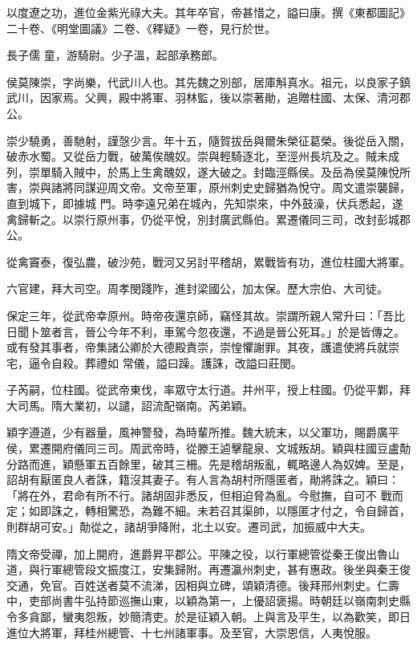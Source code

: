 \begin{pinyinscope}
 以度遼之功，進位金紫光祿大夫。其年卒官，帝甚惜之，謚曰康。撰《東都圖記》二十卷、《明堂圖議》二卷、《釋疑》一卷，見行於世。



 長子儒
 童，游騎尉。少子溫，起部承務郎。



 侯莫陳崇，字尚樂，代武川人也。其先魏之別部，居庫斛真水。祖元，以良家子鎮武川，因家焉。父興，殿中將軍、羽林監，後以崇著勛，追贈柱國、太保、清河郡公。



 崇少驍勇，善馳射，謹愨少言。年十五，隨賀拔岳與爾朱榮征葛榮。後從岳入關，破赤水蜀。又從岳力戰，破萬俟醜奴。崇與輕騎逐北，至涇州長坑及之。賊未成列，崇單騎入賊中，於馬上生禽醜奴，遂大破之。封臨涇縣侯。及岳為侯莫陳悅所害，崇與諸將同謀迎周文帝。文帝至軍，原州刺史史歸猶為悅守。周文遣崇襲歸，直到城下，即據城
 門。時李遠兄弟在城內，先知崇來，中外鼓澡，伏兵悉起，遂禽歸斬之。以崇行原州事，仍從平悅，別封廣武縣伯。累遷儀同三司，改封彭城郡公。



 從禽竇泰，復弘農，破沙苑，戰河又另討平稽胡，累戰皆有功，進位柱國大將軍。



 六官建，拜大司空。周孝閔踐阼，進封梁國公，加太保。歷大宗伯、大司徒。



 保定三年，從武帝幸原州。時帝夜還京師，竊怪其故。崇謂所親人常升曰：「吾比日聞卜筮者言，晉公今年不利，車駕今忽夜還，不過是晉公死耳。」於是皆傳之。或有發其事者，帝集諸公卿於大德殿責崇，崇惶懼謝罪。其夜，護遣使將兵就崇宅，逼令自殺。葬禮如
 常儀，謚曰躁。護誅，改謚曰莊閔。



 子芮嗣，位柱國。從武帝東伐，率眾守太行道。并州平，授上柱國。仍從平鄴，拜大司馬。隋大業初，以譴，詔流配嶺南。芮弟穎。



 穎字遵道，少有器量，風神警發，為時輩所推。魏大統末，以父軍功，賜爵廣平侯，累遷開府儀同三司。周武帝時，從滕王逌擊龍泉、文城叛胡。穎與柱國豆盧勣分路而進，穎懸軍五百餘里，破其三柵。先是稽胡叛亂，輒略邊人為奴婢。至是，詔胡有厭匿良人者誅，籍沒其妻子。有人言為胡村所隱匿者，勛將誅之。穎曰：「將在外，君命有所不行。諸胡固非悉反，但相迫脅為亂。今慰撫，自可不
 戰而定；如即誅之，轉相驚恐，為難不細。未若召其渠帥，以隱匿才付之，令自歸首，則群胡可安。」勣從之，諸胡爭降附，北土以安。遷司武，加振威中大夫。



 隋文帝受禪，加上開府，進爵昇平郡公。平陳之役，以行軍總管從秦王俊出魯山道，與行軍總管段文振度江，安集歸附。再遷瀛州刺史，甚有惠政。後坐與秦王俊交通，免官。百姓送者莫不流涕，因相與立碑，頌穎清德。後拜邢州刺史。仁壽中，吏部尚書牛弘持節巡撫山東，以穎為第一，上優詔褒揚。時朝廷以嶺南刺史縣令多貪鄙，蠻夷怨叛，妙簡清吏。於是征穎入朝。上與言及平生，以為歡笑，即日
 進位大將軍，拜桂州總管、十七州諸軍事。及至官，大崇恩信，人夷悅服。




\end{pinyinscope}

